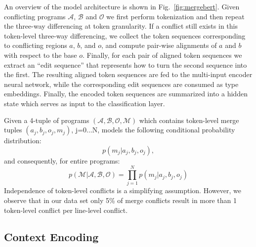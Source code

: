 An overview of the \thistool{} model architecture is shown in Fig.~\ref{fig:mergebert}. Given conflicting programs $\mathcal{A}$, $\mathcal{B}$ and $\mathcal{O}$ we first perform tokenization and then repeat the three-way differencing at token granularity. If a conflict still exists in this token-level three-way differencing, we collect the token sequences corresponding to conflicting regions $a$, $b$, and $o$, and compute pair-wise alignments of $a$ and $b$ with respect to the base $o$. Finally, for each pair of aligned token sequences we extract an ``edit sequence'' that represents how to turn the second sequence into the first. The resulting aligned token sequences are fed to the multi-input encoder neural network, while the corresponding edit sequences are consumed as type embeddings. Finally, the encoded token sequences are summarized into a hidden state which serves as input to the classification layer. 

Given a 4-tuple of programs $(\mathcal{A}, \mathcal{B}, \mathcal{O}, \mathcal{M})$ which contains token-level merge tuples $(a_{j}, b_{j}, o_{j}, m_{j})$, j=0...N, \thistool{} models the following conditional probability distribution:
\begin{equation}
    p(m_{j} | a_{j}, b_{j}, o_{j}),
\end{equation}
and consequently, for entire programs:
\begin{equation}
    p(\mathcal{M} | \mathcal{A}, \mathcal{B}, \mathcal{O}) = \prod_{j=1}^{N} p(m_{j} | a_{j}, b_{j}, o_{j})
\end{equation}
Independence of token-level conflicts is a simplifying assumption. However, we observe that in our data set only 5\% of merge conflicts result in more than 1 token-level conflict per line-level conflict. 




\subsection{Context Encoding}

